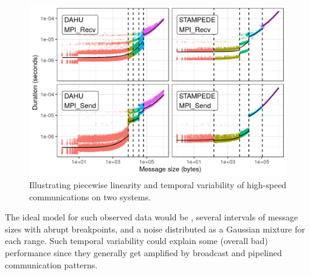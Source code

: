             \begin{figure}[htpb]
                \centering \includegraphics[width=\linewidth]{./img/prediction/modeling/network/mpi_calibration.png}
                \caption{Illustrating piecewise linearity and temporal variability of high-speed communications on two
                systems.}
                \label{fig:nw_var}
            \end{figure}

            The ideal model for such observed data would be , several intervals of message sizes
            with abrupt breakpoints, and a noise distributed as a Gaussian mixture for each range.  Such temporal
            variability could explain some (overall bad) performance since they generally get amplified by broadcast and
            pipelined communication patterns.

